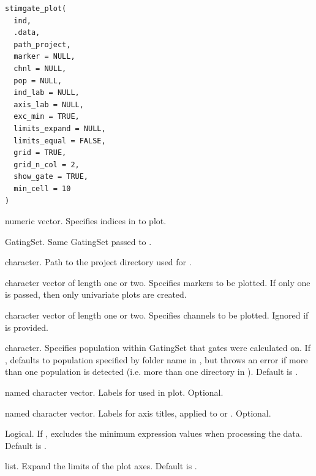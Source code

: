 \documentclass[letterpaper]{book}
\begin{document}
%
\begin{Usage}
\begin{verbatim}
stimgate_plot(
  ind,
  .data,
  path_project,
  marker = NULL,
  chnl = NULL,
  pop = NULL,
  ind_lab = NULL,
  axis_lab = NULL,
  exc_min = TRUE,
  limits_expand = NULL,
  limits_equal = FALSE,
  grid = TRUE,
  grid_n_col = 2,
  show_gate = TRUE,
  min_cell = 10
)
\end{verbatim}
\end{Usage}
%
\begin{Arguments}
\begin{ldescription}
\item[\code{ind}] numeric vector. Specifies indices in  to plot.

\item[\code{.data}] GatingSet. Same GatingSet passed to .

\item[\code{path\_project}] character.
Path to the project directory used for .

\item[\code{marker}] character vector of length one or two. Specifies markers
to be plotted. If only one is passed, then only univariate plots are created.

\item[\code{chnl}] character vector of length one or two. Specifies channels
to be plotted. Ignored if  is provided.

\item[\code{pop}] character. Specifies population within GatingSet that
gates were calculated on. If , defaults to population specified
by folder name in , but throws
an error if more than one population is detected (i.e. more
than one directory in ). Default is .

\item[\code{ind\_lab}] named character vector.
Labels for  used in plot.
Optional.

\item[\code{axis\_lab}] named character vector.
Labels for axis titles, applied to  or .
Optional.

\item[\code{exc\_min}] Logical.
If , excludes the minimum expression values when processing the data.
Default is .

\item[\code{limits\_expand}] list.
Expand the limits of the plot axes.
Default is .


\end{ldescription}
\end{Arguments}
\end{document}
